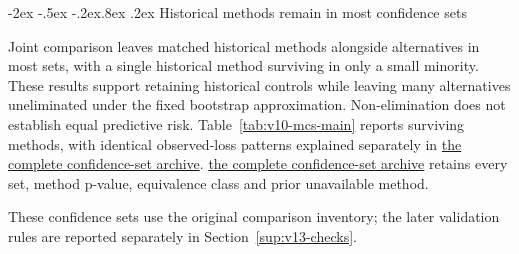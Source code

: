 \documentclass[10pt,a4paper]{article}
\makeatletter
\renewcommand\section{\@startsection{section}{1}{\z@}%
  {-2ex \@plus -.5ex \@minus -.2ex}{.8ex \@plus .2ex}%
  {\normalfont\large\bfseries}}
\makeatother
\begin{document}
\section{Historical methods remain in most confidence sets}\label{sup:v10-mcs}\label{sup:v13-mcs}

Joint comparison leaves matched historical methods alongside alternatives in most sets, with a single historical method surviving in only a small minority. These results support retaining historical controls while leaving many alternatives uneliminated under the fixed bootstrap approximation. Non-elimination does not establish equal predictive risk. Table~\ref{tab:v10-mcs-main} reports surviving methods, with identical observed-loss patterns explained separately in \href{https://github.com/ByronLi0207/financial-mathematics-paper-20261020/blob/submission-final/EXTENDED_RESULTS.md#asmbi-extended-s31}{the complete confidence-set archive}. \href{https://github.com/ByronLi0207/financial-mathematics-paper-20261020/blob/submission-final/EXTENDED_RESULTS.md#asmbi-extended-s31}{the complete confidence-set archive} retains every set, method p-value, equivalence class and prior unavailable method.

These confidence sets use the original comparison inventory; the later validation rules are reported separately in Section~\ref{sup:v13-checks}.
\end{document}
